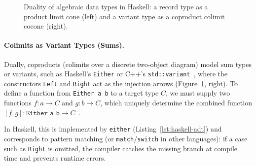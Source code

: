 \begin{figure}[tb]
  \centering
  \begin{minipage}[t]{0.47\textwidth}
    \centering
  \end{minipage}
  \hfill
  \begin{minipage}[t]{0.47\textwidth}
    \centering
  \end{minipage}
  \caption{Duality of algebraic data types in Haskell: a record type as a product limit cone (left) and a variant type as a coproduct colimit cocone (right).}
  \label{fig:prog-duality}
\end{figure}

\paragraph{Colimits as Variant Types (Sums).}
Dually, coproducts (colimits over a discrete two-object diagram) model sum types or variants, such as Haskell's \texttt{Either} or C++'s \texttt{std::variant}~\cite[Sec.~5.6, 6.3]{Milewski18}, where the constructors \texttt{Left} and \texttt{Right} act as the injection arrows (Figure~\ref{fig:prog-duality}, right). To define a function from \texttt{Either a b} to a target type $C$, we must supply two functions $f \colon a \to C$ and $g \colon b \to C$, which uniquely determine the combined function $[f, g] \colon \texttt{Either a b} \to C$~\cite[Sec.~5.6]{Milewski18}.

In Haskell, this is implemented by \texttt{either} (Listing~\ref{lst:haskell-adt}) and corresponds to pattern matching (or \texttt{match}/\texttt{switch} in other languages): if a case such as \texttt{Right} is omitted, the compiler catches the missing branch at compile time and prevents runtime errors.


